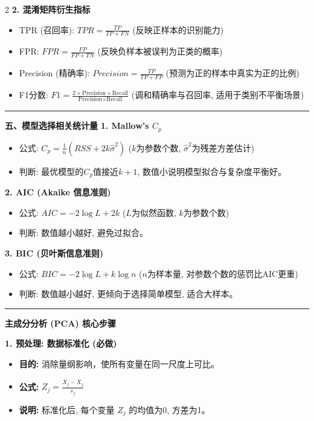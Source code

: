 \documentclass[9pt,a4paper]{article} %
\newcommand{\mysection}[1]{\vspace{0.5em}\hrule\vspace{0.3em}\noindent\textbf{\large #1}\vspace{0.1em}}
\begin{document}
\begin{multicols}{2}
\textbf{2. 混淆矩阵衍生指标}
\begin{itemize}
    \item TPR (召回率): $TPR = \frac{TP}{TP+FN}$ (反映正样本的识别能力)
    \item FPR: $FPR = \frac{FP}{FP+TN}$ (反映负样本被误判为正类的概率)
    \item Precision (精确率): $Precision = \frac{TP}{TP+FP}$ (预测为正的样本中真实为正的比例)
    \item F1分数: $F1 = \frac{2 \times \text{Precision} \times \text{Recall}}{\text{Precision} + \text{Recall}}$ (调和精确率与召回率, 适用于类别不平衡场景)
\end{itemize}

\mysection{五、模型选择相关统计量}
\textbf{1. Mallow's $C_p$}
\begin{itemize}
    \item 公式: $C_p = \frac{1}{n} (RSS + 2k\hat{\sigma}^2)$ ($k$为参数个数, $\hat{\sigma}^2$为残差方差估计)
    \item 判断: 最优模型的$C_p$值接近$k+1$, 数值小说明模型拟合与复杂度平衡好。
\end{itemize}

\textbf{2. AIC (Akaike 信息准则)}
\begin{itemize}
    \item 公式: $AIC = -2\log L + 2k$ ($L$为似然函数, $k$为参数个数)
    \item 判断: 数值越小越好, 避免过拟合。
\end{itemize}

\textbf{3. BIC (贝叶斯信息准则)}
\begin{itemize}
    \item 公式: $BIC = -2\log L + k\log n$ ($n$为样本量, 对参数个数的惩罚比AIC更重)
    \item 判断: 数值越小越好, 更倾向于选择简单模型, 适合大样本。
\end{itemize}



\mysection{主成分分析 (PCA) 核心步骤}

\textbf{1. 预处理: 数据标准化 (必做)}
\begin{itemize}
    \item \textbf{目的:} 消除量纲影响，使所有变量在同一尺度上可比。
    \item \textbf{公式:} $Z_j = \frac{X_j - \bar{X}_j}{s_j}$
    \item \textbf{说明:} 标准化后, 每个变量 $Z_j$ 的均值为0, 方差为1。
\end{itemize}


\end{multicols}
\end{document}
